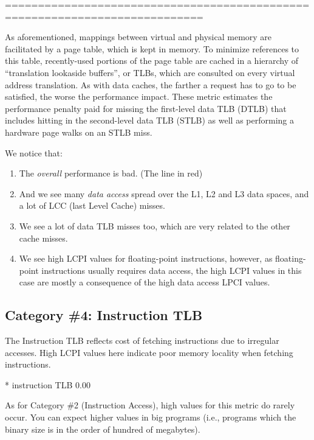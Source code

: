 ============================================================================

As aforementioned, mappings between virtual and physical memory are facilitated by a page table, which is kept in memory. To minimize references to this table, recently-used portions of the page table are cached in a hierarchy of ``translation lookaside buffers'', or TLBs, which are consulted on every virtual address translation. As with data caches, the farther a request has to go to be satisfied, the worse the performance impact. These metric estimates the performance penalty paid for missing the first-level data TLB (DTLB) that includes hitting in the second-level data TLB (STLB) as well as performing a hardware page walks on an STLB miss.

We notice that:

\begin{enumerate}
  \item The \emph{overall} performance is bad. (The line in red)
  \item And we see many \emph{data access} spread over the L1, L2 and L3 data spaces, and a lot of LCC (last Level Cache) misses.
  \item We see a lot of data TLB misses too, which are very related to the other cache misses.
  \item We see high LCPI values for floating-point instructions, however, as floating-point instructions usually requires data access, the high LCPI values in this case are mostly a consequence of the high data access LPCI values.
\end{enumerate}

\subsection{Category \#4: Instruction TLB}
\label{subsec:CAT4_Instruction_TLB}

The Instruction TLB reflects cost of fetching instructions due to irregular accesses. High LCPI values here indicate poor memory locality when fetching instructions.

\begin{prompt}
* instruction TLB       0.00
\end{prompt}

As for Category \#2 (Instruction Access), high values for this metric do rarely occur. You can expect higher values in big programs (i.e., programs which the binary size is in the order of hundred of megabytes).

